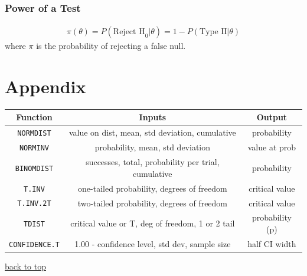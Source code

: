 \documentclass[12pt]{article}
\numberwithin{equation}{section}
\begin{document}
\subsubsection{Power of a Test}
\begin{gather}
    \pi(\theta) = P(\text{Reject H}_0|\theta) = 1 - P(\text{Type II}|\theta)
\end{gather}
where $\pi$ is the probability of rejecting a false null.

\section{Appendix}
\label{sec:appendix}

\begin{table}[!ht]
    \centering
    \footnotesize
    \begin{tabular}{c|c c}
        Function            &   Inputs  &   Output \\ \hline
        \verb|NORMDIST|     &   value on dist, mean, std deviation, cumulative  & probability   \\
        \verb|NORMINV|      &   probability, mean, std deviation            &   value at prob \\
        \verb|BINOMDIST|    &   successes, total, probability per trial, cumulative   &   probability \\
        \verb|T.INV|        &   one-tailed probability, degrees of freedom  &   critical value \\
        \verb|T.INV.2T|     &   two-tailed probability, degrees of freedom  &   critical value \\
        \verb|TDIST|        &   critical value or T, deg of freedom, 1 or 2 tail    &  probability (p) \\
        \verb|CONFIDENCE.T| &   1.00 - confidence level, std dev, sample size    &   half CI width \\
    \end{tabular}
    \label{tab:sheet_functions}
\end{table}


\begin{flushright} \hyperref[sec:top]{back to top} \end{flushright}
\end{document}
